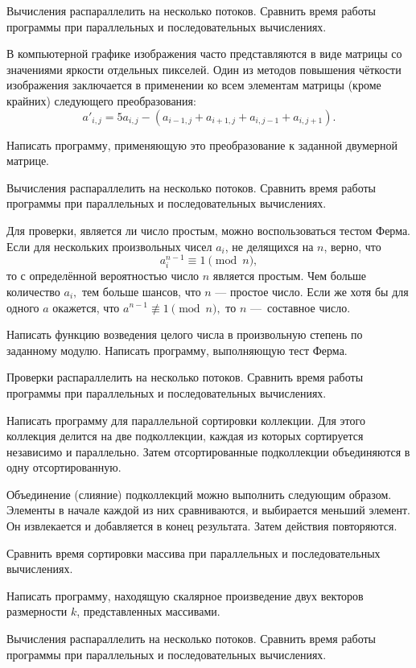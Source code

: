 Вычисления распараллелить на несколько потоков. Сравнить время работы
программы при параллельных и последовательных вычислениях.

\task В компьютерной графике изображения часто представляются в виде
матрицы со значениями яркости отдельных пикселей. Один из методов
повышения чёткости изображения заключается в применении ко всем
элементам матрицы (кроме крайних) следующего преобразования:
\[
a'_{i,j} = 5a_{i,j} - \left(
  a_{i-1, j} + a_{i+1, j} + a_{i, j-1} + a_{i, j+1}
\right).
\]

Написать программу, применяющую это преобразование к заданной
двумерной матрице.

Вычисления распараллелить на несколько потоков. Сравнить время работы
программы при параллельных и последовательных вычислениях.

\task Для проверки, является ли число простым, можно воспользоваться
тестом Ферма. Если для нескольких произвольных чисел $a_i$, не
делящихся на $n$, верно, что
\[
a_i^{n-1} \equiv 1 \pmod n,
\]
то с определённой вероятностью число $n$ является простым. Чем больше
количество $a_i,$ тем больше шансов, что $n$ — простое число. Если же
хотя бы для одного $a$ окажется, что $a^{n-1}\not\equiv1 \pmod n,$ то
$n$ — составное число.

Написать функцию возведения целого числа в произвольную степень по
заданному модулю. Написать программу, выполняющую тест Ферма.

Проверки распараллелить на несколько потоков. Сравнить время работы
программы при параллельных и последовательных вычислениях.

\task Написать программу для параллельной сортировки коллекции. Для
этого коллекция делится на две подколлекции, каждая из которых
сортируется независимо и параллельно. Затем отсортированные подколлекции
объединяются в одну отсортированную.

Объединение (слияние) подколлекций можно выполнить следующим
образом. Элементы в начале каждой из них сравниваются, и выбирается
меньший элемент. Он извлекается и добавляется в конец
результата. Затем действия повторяются.

Сравнить время сортировки массива при параллельных и последовательных
вычислениях.

\task Написать программу, находящую скалярное произведение двух
векторов размерности $k$, представленных массивами.

Вычисления распараллелить на несколько потоков. Сравнить время работы
программы при параллельных и последовательных вычислениях.


